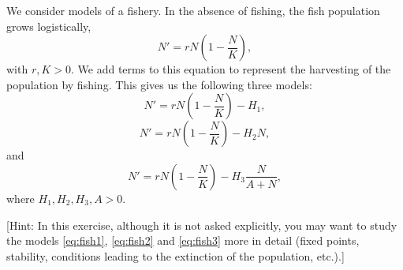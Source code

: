 \documentclass[12pt]{exam}
\begin{document}
\begin{questions}
\vskip1cm
\question[20]
We consider models of a fishery. In the absence of fishing, the fish population
grows logistically,
\[
N'=rN\left(1-\frac NK\right),
\]
with $r,K>0$. We add terms to this equation to represent the
harvesting of the population by fishing. This gives us the following three
models:
\begin{equation}\label{eq:fish1}
N'=rN\left(1-\frac NK\right)-H_1,
\end{equation}
\begin{equation}\label{eq:fish2}
N'=rN\left(1-\frac NK\right)-H_2N,
\end{equation}
and
\begin{equation}\label{eq:fish3}
N'=rN\left(1-\frac NK\right)-H_3\frac{N}{A+N},
\end{equation}
where $H_1,H_2,H_3,A>0$.
[Hint: In this exercise, although it is not asked explicitly, you may want to
study the models \eqref{eq:fish1}, \eqref{eq:fish2} and \eqref{eq:fish3} more in
detail (fixed points, stability, conditions leading to the extinction of the
population, etc.).]




\end{questions}
\end{document}
